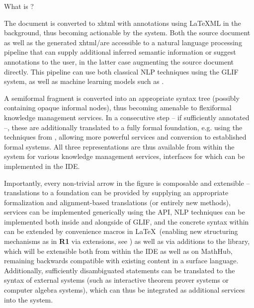 \begin{sfragment}{What is \sTeX?}
{The document is converted to xhtml with \omdoc annotations
using \LaTeX ML in the background,
thus becoming actionable by the \mmt system. Both the source document
as well as the generated xhtml/\omdoc are accessible to a natural language
processing pipeline that can supply additional inferred semantic 
information or suggest annotations to the user, in the latter case 
augmenting the source document directly. This pipeline can use both 
classical NLP techniques using the GLIF system, as well as machine 
learning models such as \cite{own:fifom}.

A semiformal fragment is converted 
into an appropriate syntax tree (possibly containing opaque
informal nodes), 
thus becoming amenable
to flexiformal knowledge management services. In a consecutive step
-- if sufficiently annotated --, these are
additionally translated
to a fully formal foundation, e.g. using the techniques from 
\cite{DMueller:phd:19,own:translations}, allowing
more powerful services and conversion to established formal
systems. All three representations
are thus available from within the \mmt system for various
knowledge management services, interfaces for which can be
implemented in the IDE.

Importantly, every non-trivial arrow in the figure is 
composable and extensible -- 
translations to a foundation can be provided
by supplying an appropriate formalization and alignment-based
translations (or entirely new methods),
services can be implemented generically using the \mmt API,
NLP techniques can be implemented both inside and alongside of
GLIF, and the concrete syntax within \sTeX can be extended
by convenience macros in \LaTeX\ (enabling new
structuring mechanisms as in \textbf{R1} via 
\mmt extensions, see
\cite{MueRabRot:rslffml20}) as well as via additions to
the library, which will be extensible both from within the IDE
as well as on MathHub,
remaining backwards compatible with existing content in a surface 
language. Additionally, sufficiently disambiguated
statements can be translated to the syntax of 
external systems (such as interactive theorem prover systems
or computer algebra systems),
which can thus be integrated as additional services into the system.
}

\end{sfragment}

